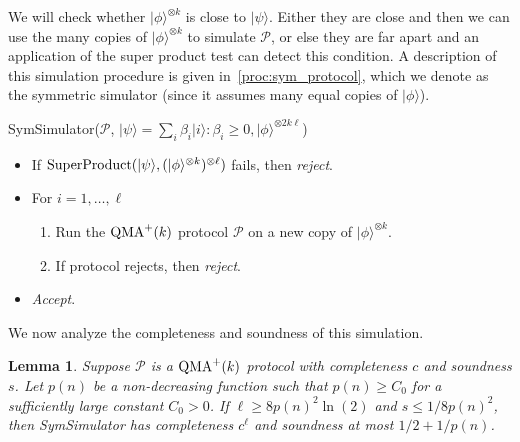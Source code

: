 \documentclass[10pt,a4paper]{article}
\newtheorem{lemma}[theorem]{Lemma}
\theoremstyle{remark}
\def\cal{\mathcal}
\newcommand{\calP}{{\cal P}}
\newcommand{\1}[1]{\mathds{1}{[#1]}}
\newcommand{\ket}[1]{\lvert #1\rangle}
\newcommand{\QMA}{\textup{QMA}}
\numberwithin{equation}{section}
\begin{document}
We will check whether  $\ket{\phi}^{\otimes k}$
is close to $\ket{\psi}$. Either they are close and then we can use the many copies of $\ket{\phi}^{\otimes k}$
to simulate $\calP$, or else they are far apart and an application of the super product test can detect this
condition. A description of this simulation procedure is given in~\cref{proc:sym_protocol}, which we denote
as the symmetric simulator (since it assumes many equal copies of $\ket{\phi}$).

\begin{algorithm}[H]{SymSimulator}{($\calP$, $\ket{\psi} = \sum_i \beta_i \ket{i} \colon \beta_i \ge 0, \ket{\phi}^{\otimes 2 k \ell}$)}
     \begin{itemize}
       \item If $\textup{SuperProduct}(\ket{\psi},(\ket{\phi}^{\otimes k})^{\otimes \ell})$ fails, then \emph{reject}.
       \item For $i=1,\ldots,\ell$ \begin{enumerate}
          \item Run the $\QMA^+(k)$ protocol $\calP$ on a new copy of $\ket{\phi}^{\otimes k}$.
          \item If protocol rejects, then \emph{reject}.
       \end{enumerate}
       \item \emph{Accept}.
     \end{itemize}
     \caption{Symmetric Simulator}\label{proc:sym_protocol}
\end{algorithm}

We now analyze the completeness and soundness of this simulation.

\begin{lemma}\label{lem:sym_simulator}
  Suppose $\calP$ is a $\QMA^+(k)$ protocol with completeness $c$ and soundness $s$.
  Let $p(n)$ be a non-decreasing function such that $p(n) \ge C_0$ for a sufficiently large
  constant $C_0 > 0$. If $\ell \ge 8 p(n)^2 \ln(2)$ and $s \le 1/8p(n)^2$, then 
  SymSimulator has completeness $c^\ell$ and soundness at most $1/2 + 1/p(n)$.
\end{lemma}
\end{document}
